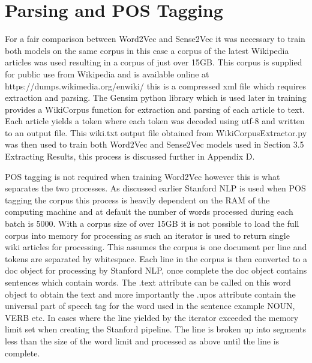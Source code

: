 \section{Parsing and POS Tagging}
For a fair comparison between Word2Vec and Sense2Vec it was necessary to train both models on the same corpus in this case a corpus of the latest Wikipedia articles was used resulting in a corpus of just over 15GB. This corpus is supplied for public use from Wikipedia and is available online at https://dumps.wikimedia.org/enwiki/ this is a compressed xml file which requires extraction and parsing. The Gensim python library which is used later in training provides a WikiCorpus function for extraction and parsing of each article to text. Each article yields a token where each token was decoded using utf-8 and written to an output file. This wiki.txt output file obtained from WikiCorpusExtractor.py was then used to train both Word2Vec and Sense2Vec models used in Section 3.5 Extracting Results, this process is discussed further in Appendix D.

POS tagging is not required when training Word2Vec however this is what separates the two processes. As discussed earlier Stanford NLP is used when POS tagging the corpus this process is heavily dependent on the RAM of the computing machine and at default the number of words processed during each batch is 5000. With a corpus size of over 15GB it is not possible to load the full corpus into memory for processing as such an iterator is used to return single wiki articles for processing. This assumes the corpus is one document per line and tokens are separated by whitespace. Each line in the corpus is then converted to a doc object for processing by Stanford NLP, once complete the doc object contains sentences which contain words. The .text attribute can be called on this word object to obtain the text and more importantly the .upos attribute contain the universal part of speech tag for the word used in the sentence example NOUN, VERB etc. In cases where the line yielded by the iterator exceeded the memory limit set when creating the Stanford pipeline. The line is broken up into segments less than the size of the word limit and processed as above until the line is complete.


